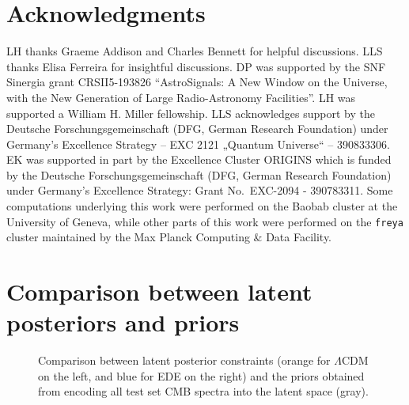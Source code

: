 \documentclass[aps, prd, reprint, superscriptaddress, nofootinbib, bibnotes]{revtex4-2}
\begin{document}

\section*{Acknowledgments}
LH thanks Graeme Addison and Charles Bennett for helpful discussions. LLS thanks Elisa Ferreira for insightful discussions. DP was supported by the SNF Sinergia grant CRSII5-193826 “AstroSignals: A New Window on the Universe, with the New Generation of Large Radio-Astronomy Facilities”. LH was supported a William H. Miller fellowship.
LLS acknowledges support by the Deutsche Forschungsgemeinschaft (DFG, German Research Foundation) under Germany’s Excellence Strategy – EXC 2121 „Quantum Universe“ – 390833306.
EK was supported in part by the Excellence Cluster ORIGINS which is funded by the Deutsche Forschungsgemeinschaft (DFG, German Research Foundation) under Germany’s Excellence Strategy: Grant No.~EXC-2094 - 390783311. Some computations underlying this work were performed on the Baobab cluster at the University of Geneva, while other parts of this work were performed on the \texttt{freya} cluster maintained by the Max Planck Computing \& Data Facility.






\appendix
\section{Comparison between latent posteriors and priors}
\label{app:latentpriors}

\begin{figure*}
    \centering
\caption{Comparison between latent posterior constraints (orange for $\Lambda$CDM on the left, and blue for EDE on the right) and the priors obtained from encoding all test set CMB spectra into the latent space (gray).}
\label{fig:posteriorsvspriors}
\end{figure*}
\end{document}
